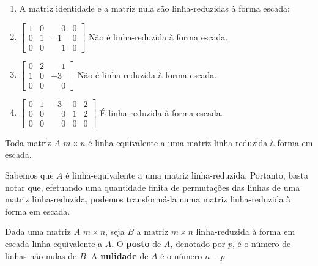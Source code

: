 \begin{exemplo}
	\begin{enumerate}[label={\arabic*})]
		\item  A matriz identidade e a matriz nula s\~ao linha-reduzidas \`a forma escada;
		\item $\begin{bmatrix}
		1 & 0 & \phantom{-}0 & 0\\
		0 & 1 & -1 & 0\\
		0 & 0 & \phantom{-}1 & 0
		\end{bmatrix}$ N\~ao \'e linha-reduzida \`a forma escada.
		\item $\begin{bmatrix}
		0 & 2 & \phantom{-}1\\
		1 & 0 & -3\\
		0 & 0 & \phantom{-}0
		\end{bmatrix}$ N\~ao \'e linha-reduzida \`a forma escada.
		\item $\begin{bmatrix}
		0 & 1 & -3 & 0 & 2\\
		0 & 0 & \phantom{-}0 & 1 & 2\\
		0 & 0 & \phantom{-}0 & 0 & 0
		\end{bmatrix}$ \'E linha-reduzida \`a forma escada.
	\end{enumerate}
\end{exemplo}

\begin{teorema}
	Toda matriz $A$ $m \times n$ \'e linha-equivalente a uma matriz linha-reduzida \`a forma em escada.
\end{teorema}
\begin{prova}
	Sabemos que $A$ \'e linha-equivalente a uma matriz linha-reduzida. Portanto, basta notar que, efetuando uma quantidade finita de permuta\c{c}\~oes das linhas de uma matriz linha-reduzida, podemos transform\'a-la numa matriz linha-reduzida \`a forma em escada.
\end{prova}

\begin{definicao}
	Dada uma matriz $A$ $m \times n$, seja $B$ a matriz $m \times n$ linha-reduzida \`a forma em escada linha-equivalente a $A$. O \textbf{posto} de $A$, denotado por $p$, \'e o n\'umero de linhas n\~ao-nulas de $B$. A \textbf{nulidade} de $A$ \'e o n\'umero $n - p$.
\end{definicao}

